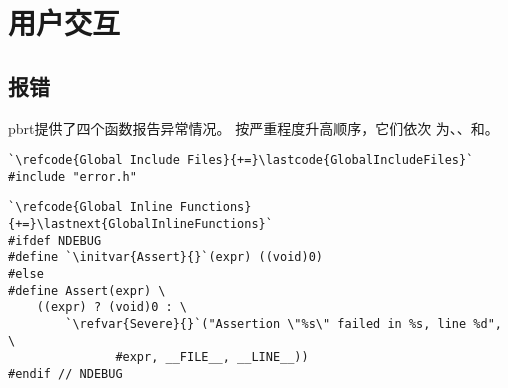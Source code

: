 \section{用户交互}\label{sec:用户交互}

\subsection{报错}\label{sub:报错}
pbrt提供了四个函数报告异常情况。
按严重程度升高顺序，它们依次
为{}、{}、{}和{}。

\begin{lstlisting}
`\refcode{Global Include Files}{+=}\lastcode{GlobalIncludeFiles}`
#include "error.h"
\end{lstlisting}

\begin{lstlisting}
`\refcode{Global Inline Functions}{+=}\lastnext{GlobalInlineFunctions}`
#ifdef NDEBUG
#define `\initvar{Assert}{}`(expr) ((void)0)
#else
#define Assert(expr) \
    ((expr) ? (void)0 : \
        `\refvar{Severe}{}`("Assertion \"%s\" failed in %s, line %d", \
               #expr, __FILE__, __LINE__))
#endif // NDEBUG
\end{lstlisting}